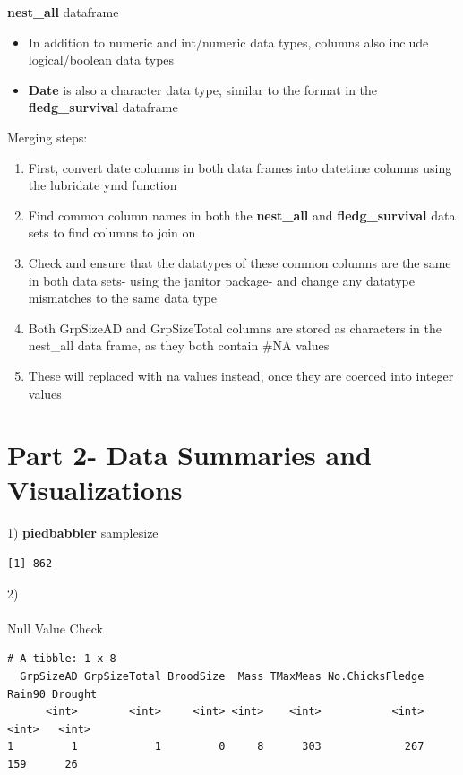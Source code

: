 \documentclass[
  letterpaper,
  DIV=11,
  numbers=noendperiod]{scrartcl}
\makeatletter
\let\oldparagraph\paragraph
\renewcommand{\paragraph}{
    \@ifstar
      \xxxParagraphStar
      \xxxParagraphNoStar
  }
\newcommand{\xxxParagraphStar}[1]{\oldparagraph*{#1}\mbox{}}
\newcommand{\xxxParagraphNoStar}[1]{\oldparagraph{#1}\mbox{}}
\makeatother
\begin{document}
\textbf{nest\_all} dataframe

\begin{itemize}
\item
  In addition to numeric and int/numeric data types, columns also
  include logical/boolean data types
\item
  \textbf{Date} is also a character data type, similar to the format in
  the \textbf{fledg\_survival} dataframe
\end{itemize}

Merging steps:

\begin{enumerate}
\def\labelenumi{\arabic{enumi}.}
\item
  First, convert date columns in both data frames into datetime columns
  using the lubridate ymd function
\item
  Find common column names in both the \textbf{nest\_all} and
  \textbf{fledg\_survival} data sets to find columns to join on
\item
  Check and ensure that the datatypes of these common columns are the
  same in both data sets- using the janitor package- and change any
  datatype mismatches to the same data type
\item
  Both GrpSizeAD and GrpSizeTotal columns are stored as characters in
  the nest\_all data frame, as they both contain \#NA values
\item
  These will replaced with na values instead, once they are coerced into
  integer values
\end{enumerate}

\section{Part 2- Data Summaries and
Visualizations}\label{part-2--data-summaries-and-visualizations}

1) \textbf{piedbabbler} samplesize

\begin{verbatim}
[1] 862
\end{verbatim}

2)

\paragraph{Null Value Check}\label{null-value-check}

\begin{verbatim}
# A tibble: 1 x 8
  GrpSizeAD GrpSizeTotal BroodSize  Mass TMaxMeas No.ChicksFledge Rain90 Drought
      <int>        <int>     <int> <int>    <int>           <int>  <int>   <int>
1         1            1         0     8      303             267    159      26
\end{verbatim}
\end{document}
